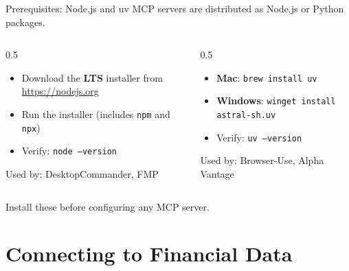 \documentclass[aspectratio=169]{beamer}
\begin{document}
\begin{frame}[fragile]{Prerequisites: Node.js and uv}
MCP servers are distributed as Node.js or Python packages.
\vspace{0.2cm}
\begin{columns}[T]
\begin{column}{0.5\textwidth}
\begin{shadedbox}[title=\textbf{Node.js} (for \texttt{npx} servers)]
\begin{itemize}\small
  \item Download the \textbf{LTS} installer from \url{https://nodejs.org}
  \item Run the installer (includes \texttt{npm} and \texttt{npx})
  \item Verify: \texttt{node --version}
\end{itemize}
\vspace{0.1cm}
{\scriptsize Used by: DesktopCommander, FMP}
\end{shadedbox}
\end{column}
\begin{column}{0.5\textwidth}
\begin{shadedbox}[title=\textbf{uv} (for \texttt{uvx} servers)]
\begin{itemize}\small
  \item \textbf{Mac}: \texttt{brew install uv}
  \item \textbf{Windows}: \texttt{winget install astral-sh.uv}
  \item Verify: \texttt{uv --version}
\end{itemize}
\vspace{0.1cm}
{\scriptsize Used by: Browser-Use, Alpha Vantage}
\end{shadedbox}
\end{column}
\end{columns}
\vspace{0.2cm}
\begin{center}\small
\alert{Install these before configuring any MCP server.}
\end{center}
\end{frame}

\section{Connecting to Financial Data}
\end{document}
